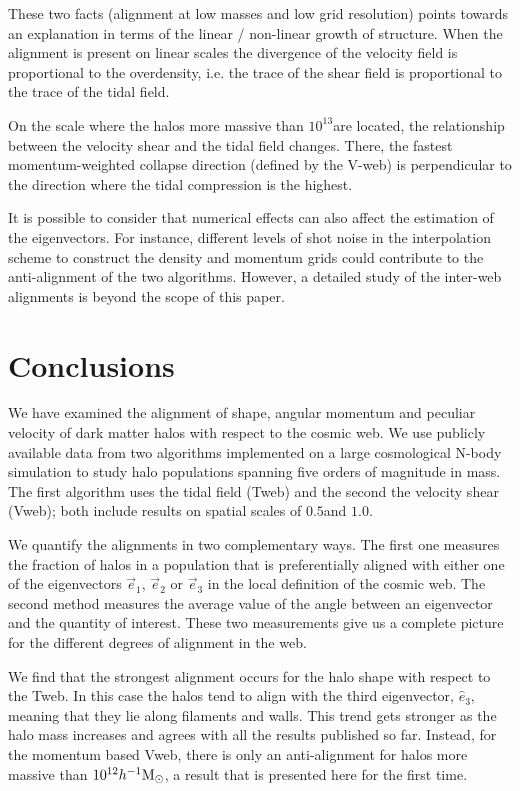 \documentclass[useAMS,usenatbib]{mn2e}
\newcommand{\hMpc}{{\ifmmode{h^{-1}{\rm Mpc}}\else{$h^{-1}$Mpc }\fi}}
\newcommand{\hMsun}{{\ifmmode{h^{-1}{\rm
        {M_{\odot}}}}\else{$h^{-1}{\rm{M_{\odot}}}$~}\fi}}
\begin{document}
These two facts (alignment at low masses and low grid resolution)
points towards an explanation in terms of the  linear / non-linear
growth of structure. When the alignment is present on linear scales
the divergence of the velocity field is proportional to the
overdensity, i.e. the trace of the shear field is proportional to the
trace of the tidal field.

On the scale where the halos more massive than $10^{13}$\hMsun are
located, the relationship between the velocity shear and the tidal
field changes. There, the fastest momentum-weighted collapse direction
(defined by the V-web) is perpendicular to the direction where the
tidal compression is the highest. 

It is possible to consider that numerical effects can also
affect the estimation of the eigenvectors. For instance,
different levels of shot noise in the interpolation scheme to
construct the density and momentum grids could contribute to the
anti-alignment of the two algorithms. However, a detailed study of the
inter-web alignments is beyond the scope of this paper.


\section{Conclusions}
\label{sec:conclusions}

We have examined the alignment of shape, angular momentum and peculiar
velocity of dark matter halos with respect to the cosmic web. We use
publicly available data from two algorithms implemented on a large
cosmological N-body simulation to study halo populations spanning five
orders of magnitude in mass. The first algorithm uses the tidal field (Tweb)
and the second the velocity shear (Vweb); both include results on
spatial scales of $0.5$\hMpc and $1.0$\hMpc.   

We quantify the alignments in two complementary ways. The first one
measures the fraction of halos in a population that is preferentially
aligned with either one of the eigenvectors $\vec{e}_1$, $\vec{e}_2$
or $\vec{e}_3$ in the local definition of the cosmic web. The second
method measures the average value of the angle between an eigenvector
and the quantity of interest. These two measurements give us a
complete picture for the different degrees of alignment in the web.

We find that the strongest alignment occurs for the halo shape with
respect to the Tweb. In this case the halos tend to align with the
third eigenvector, $\hat{e}_3$, meaning that they lie along filaments
and walls. This trend gets stronger as the halo mass
increases and agrees with all the results published so far. Instead,
for the momentum based Vweb, there is only an anti-alignment for halos
more massive than $10^{12}\hMsun$, a result that is presented here for the first
time. 
\end{document}
